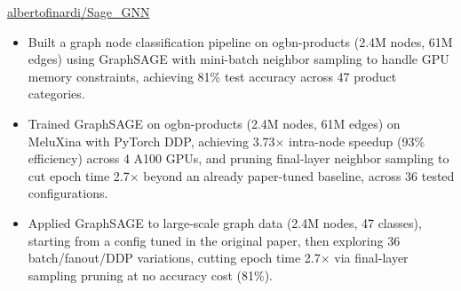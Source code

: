  {}
{
}
{\href{https://github.com/albertofinardi/Sage_GNN}
{albertofinardi/Sage\_GNN}}
\begin{itemize}

    \ifde
        \item Built a graph node classification pipeline on ogbn-products (2.4M nodes, 61M edges) using GraphSAGE with mini-batch neighbor sampling to handle GPU memory constraints, achieving 81\% test accuracy across 47 product categories.
    \else
        \ifhpc
            \item Trained GraphSAGE on ogbn-products (2.4M nodes, 61M edges) on MeluXina with PyTorch DDP, achieving 3.73$\times$ intra-node speedup (93\% efficiency) across 4 A100 GPUs, and pruning final-layer neighbor sampling to cut epoch time 2.7$\times$ beyond an already paper-tuned baseline, across 36 tested configurations.
        \else
            \item Applied GraphSAGE to large-scale graph data (2.4M nodes, 47 classes), starting from a config tuned in the original paper, then exploring 36 batch/fanout/DDP variations, cutting epoch time 2.7$\times$ via final-layer sampling pruning at no accuracy cost (81\%).
        \fi
    \fi

\end{itemize}

\medskip

